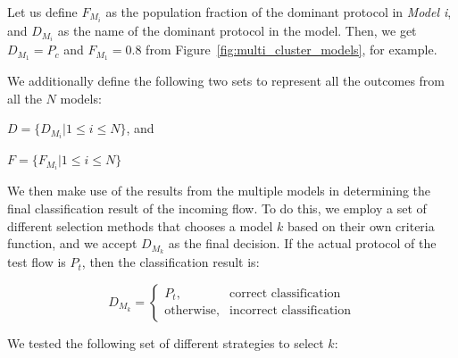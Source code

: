 \documentclass[conference]{IEEEtran}
\begin{document}
Let us define $F_{M_i}$ as the population fraction of the dominant protocol in \emph{Model i}, 
and $D_{M_i}$ as the name of the dominant protocol in the model.
Then, we get $D_{M_1} = P_c$ and $F_{M_1} = 0.8$ from Figure~\ref{fig:multi_cluster_models}, for example.

We additionally define the following two sets to represent all the outcomes from all the $N$ models:
\vspace{.2cm}

$D = \{ D_{M_i} | 1 \leq i \leq N \}$, and 

$F = \{ F_{M_i} | 1 \leq i \leq N \}$

\vspace{.2cm}

We then make use of the results from the multiple models in determining the final classification result of the incoming flow. 
To do this, we employ a set of different selection methods that chooses a model $k$ based on their own criteria function, and we accept $D_{M_k}$ as the final decision.
If the actual protocol of the test flow is $P_t$, then the classification result is:

\[ 
D_{M_k} = 
\begin{cases}
    P_t,& \text{correct classification}\\
    \text{otherwise}, & \text{incorrect classification}
\end{cases}
\]
 
We tested the following set of different strategies to select $k$:
\end{document}
